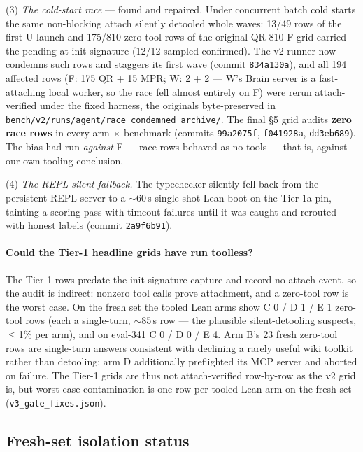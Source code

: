 \documentclass[10pt]{article}
\newcommand{\code}[1]{\texttt{#1}}
\begin{document}
(3) \emph{The cold-start race} --- found and repaired. Under concurrent
batch cold starts the same non-blocking attach silently detooled whole
waves: 13/49 rows of the first U launch and 175/810 zero-tool rows of
the original QR-810 F grid carried the pending-at-init signature (12/12
sampled confirmed). The v2 runner now condemns such rows and staggers
its first wave (commit \code{834a130a}), and all 194 affected rows (F:
175 QR + 15 MPR; W: 2 + 2 --- W's Brain server is a fast-attaching
local worker, so the race fell almost entirely on F) were rerun
attach-verified under the fixed harness, the originals byte-preserved in
\code{bench/v2/runs/agent/race\_condemned\_archive/}. The final \S 5
grid audits \textbf{zero race rows} in every arm $\times$ benchmark
(commits \code{99a2075f}, \code{f041928a}, \code{dd3eb689}). The bias
had run \emph{against} F --- race rows behaved as no-tools --- that is,
against our own tooling conclusion.

(4) \emph{The REPL silent fallback.} The typechecker silently fell back
from the persistent REPL server to a $\sim$60\,s single-shot Lean boot
on the Tier-1a pin, tainting a scoring pass with timeout failures until
it was caught and rerouted with honest labels (commit \code{2a9f6b91}).

\paragraph{Could the Tier-1 headline grids have run toolless?} The
Tier-1 rows predate the init-signature capture and record no attach
event, so the audit is indirect: nonzero tool calls prove attachment,
and a zero-tool row is the worst case. On the fresh set the tooled Lean
arms show C 0 / D 1 / E 1 zero-tool rows (each a single-turn,
$\sim$85\,s row --- the plausible silent-detooling suspects, $\leq$1\%
per arm), and on eval-341 C 0 / D 0 / E 4. Arm B's 23 fresh zero-tool
rows are single-turn answers consistent with declining a rarely useful
wiki toolkit rather than detooling; arm D additionally preflighted its
MCP server and aborted on failure. The Tier-1 grids are thus not
attach-verified row-by-row as the v2 grid is, but worst-case
contamination is one row per tooled Lean arm on the fresh set
(\code{v3\_gate\_fixes.json}).

\subsection{Fresh-set isolation status}\label{sec:isolation}
\end{document}
